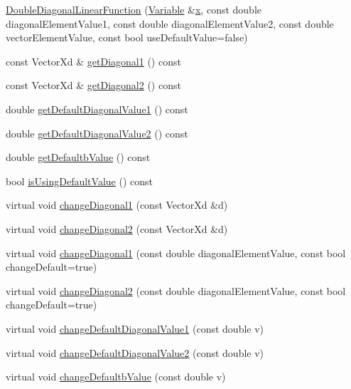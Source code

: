 \begin{DoxyCompactItemize}
\item 
\hyperlink{classocra_1_1DoubleDiagonalLinearFunction_aa46fa50d5728569eb834438dfd3a9228}{Double\+Diagonal\+Linear\+Function} (\hyperlink{classocra_1_1Variable}{Variable} \&\hyperlink{classocra_1_1Function_a28825886d1f149c87b112ec2ec1dd486}{x}, const double diagonal\+Element\+Value1, const double diagonal\+Element\+Value2, const double vector\+Element\+Value, const bool use\+Default\+Value=false)
\item 
const Vector\+Xd \& \hyperlink{classocra_1_1DoubleDiagonalLinearFunction_a7d1cea2c8b94bc70854377779b49c966}{get\+Diagonal1} () const
\item 
const Vector\+Xd \& \hyperlink{classocra_1_1DoubleDiagonalLinearFunction_a764b18fae37fa4dd6ecff2240c583a90}{get\+Diagonal2} () const
\item 
double \hyperlink{classocra_1_1DoubleDiagonalLinearFunction_a9093eef2a34b3c96b9510794b91279cc}{get\+Default\+Diagonal\+Value1} () const
\item 
double \hyperlink{classocra_1_1DoubleDiagonalLinearFunction_a3593bb0fc409844b8d30e4785565c389}{get\+Default\+Diagonal\+Value2} () const
\item 
double \hyperlink{classocra_1_1DoubleDiagonalLinearFunction_a51c22f2f4a7ae45bf61d5ee36345acb4}{get\+Defaultb\+Value} () const
\item 
bool \hyperlink{classocra_1_1DoubleDiagonalLinearFunction_a8a20ef8ec7347cdd86b630c33eed3e9e}{is\+Using\+Default\+Value} () const
\item 
virtual void \hyperlink{classocra_1_1DoubleDiagonalLinearFunction_aa49e6964582aa9da6c02bacb68937e4d}{change\+Diagonal1} (const Vector\+Xd \&d)
\item 
virtual void \hyperlink{classocra_1_1DoubleDiagonalLinearFunction_aa6ec35d1e7abf6300e7ba37e42c3b467}{change\+Diagonal2} (const Vector\+Xd \&d)
\item 
virtual void \hyperlink{classocra_1_1DoubleDiagonalLinearFunction_ace71385fd62acf0749cbcf96a0477868}{change\+Diagonal1} (const double diagonal\+Element\+Value, const bool change\+Default=true)
\item 
virtual void \hyperlink{classocra_1_1DoubleDiagonalLinearFunction_a1a9ec0f7bb11ae2f1ddd6dffceea8921}{change\+Diagonal2} (const double diagonal\+Element\+Value, const bool change\+Default=true)
\item 
virtual void \hyperlink{classocra_1_1DoubleDiagonalLinearFunction_a982adc5313b550ac6fa3b420051a9505}{change\+Default\+Diagonal\+Value1} (const double v)
\item 
virtual void \hyperlink{classocra_1_1DoubleDiagonalLinearFunction_a1380c4f6f99af312d2eae2b0355be4cc}{change\+Default\+Diagonal\+Value2} (const double v)
\item 
virtual void \hyperlink{classocra_1_1DoubleDiagonalLinearFunction_a8af650affad3759e7a069d0cabcd4c2e}{change\+Defaultb\+Value} (const double v)
\end{DoxyCompactItemize}
